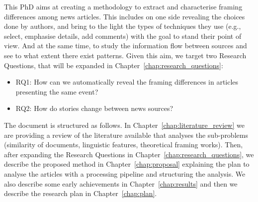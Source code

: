
This PhD aims at creating a methodology to extract and characterise framing differences among news articles.
This includes on one side revealing the choices done by authors, and bring to the light the types of techniques they use (e.g., select, emphasise details, add comments) with the goal to stand their point of view.
And at the same time, to study the information flow between sources and see to what extent there exist patterns.
Given this aim, we target two Research Questions, that will be expanded in Chapter~\ref{chap:research_questions}:

\begin{itemize}
    \item RQ1: How can we automatically reveal the framing differences in articles presenting the same event?
    \item RQ2: How do stories change between news sources?
\end{itemize}









The document is structured as follows.
In Chapter~\ref{chap:literature_review} we are providing a review of the literature available that analyses the sub-problems (similarity of documents, linguistic features, theoretical framing works).
Then, after expanding the Research Questions in Chapter~\ref{chap:research_questions}, we describe the proposed method in Chapter~\ref{chap:proposal} explaining the plan to analyse the articles with a processing pipeline and structuring the analysis.
We also describe some early achievements in Chapter~\ref{chap:results} and then we describe the research plan in Chapter~\ref{chap:plan}.


